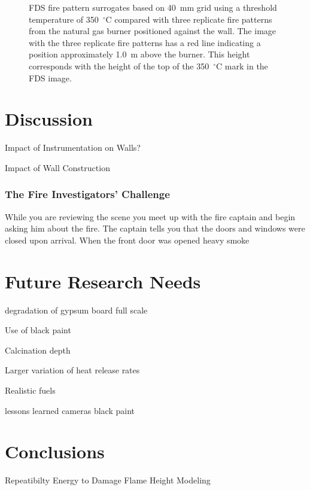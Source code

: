 \documentclass[twoside]{uocthesis}
\begin{document}
\begin{figure}[h]
  \caption[FDS fire pattern surrogates based on 40~mm grid using a threshold temperature of 350~$^\circ$C compared with three replicate fire patterns from the natural gas burner positioned against the wall]{FDS fire pattern surrogates based on 40~mm grid using a threshold temperature of 350~$^\circ$C compared with three replicate fire patterns from the natural gas burner positioned against the wall.  The image with the three replicate fire patterns has a red line indicating a position approximately 1.0~m above the burner.  This height corresponds with the height of the top of the 350~$^\circ$C mark in the FDS image.}
  \label{FDS_FirePattern_comp}
\end{figure}


\chapter{Discussion}


Impact of Instrumentation on Walls?

Impact of Wall Construction


\subsection{The Fire Investigators' Challenge}

While you are reviewing the scene you meet up with the fire captain and begin asking him about the fire.  The captain tells you that the doors and windows were closed upon arrival.  When the front door was opened heavy smoke 


\chapter{Future Research Needs}

degradation of gypsum board full scale

Use of black paint

Calcination depth

Larger variation of heat release rates

Realistic fuels

lessons learned  cameras   black paint



\chapter{Conclusions}

Repeatibilty
Energy to Damage
Flame Height
Modeling 




\end{document}
